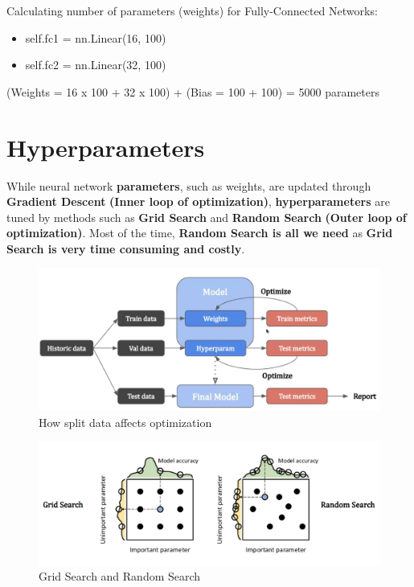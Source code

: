 \begin{example}
    Calculating number of parameters (weights) for Fully-Connected Networks:
    \begin{itemize}
        \item self.fc1 = nn.Linear(16, 100)
        \item self.fc2 = nn.Linear(32, 100)
    \end{itemize}
(Weights = 16 x 100 + 32 x 100) + (Bias = 100 + 100) = 5000 parameters
\end{example}

\section{Hyperparameters}

While neural network \textbf{parameters}, such as weights, are updated through \textbf{Gradient Descent} \textbf{(Inner loop of optimization)}, \textbf{hyperparameters} are tuned by methods such as \textbf{Grid Search} and\textbf{ Random Search} \textbf{(Outer loop of optimization)}. Most of the time, \textbf{Random Search is all we need} as \textbf{Grid Search is very time consuming and costly}. 

\begin{figure}[h!t]
    \centering
    \includegraphics[width=0.75\linewidth]{hyperparams.png}
    \caption{How split data affects optimization}
    \label{fig:enter-label}
\end{figure}

\begin{figure} [h!t]
    \centering
    \includegraphics[width=0.75\linewidth]{tuninghyperparams.png}
    \caption{Grid Search and Random Search}
    \label{fig:enter-label}
\end{figure}

